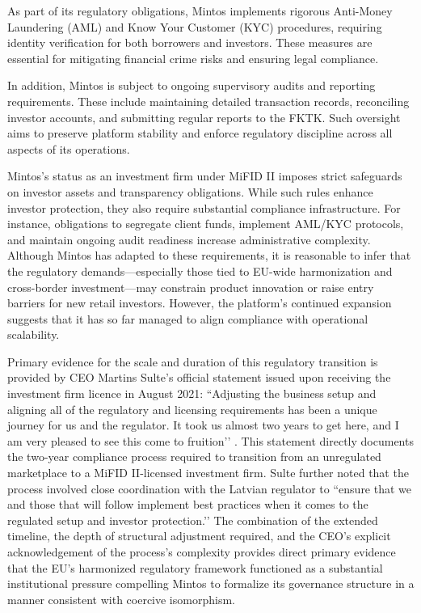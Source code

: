 \documentclass[pdflatex,sn-apa]{sn-jnl}%
\theoremstyle{thmstyleone}%
\theoremstyle{thmstyletwo}%
\theoremstyle{thmstylethree}%
\begin{document}
As part of its regulatory obligations, Mintos implements rigorous Anti-Money Laundering (AML) and Know Your Customer (KYC) procedures, requiring identity verification for both borrowers and investors. These measures are essential for mitigating financial crime risks and ensuring legal compliance.

In addition, Mintos is subject to ongoing supervisory audits and reporting requirements. These include maintaining detailed transaction records, reconciling investor accounts, and submitting regular reports to the FKTK. Such oversight aims to preserve platform stability and enforce regulatory discipline across all aspects of its operations.

Mintos’s status as an investment firm under MiFID II imposes strict safeguards on investor assets and transparency obligations. While such rules enhance investor protection, they also require substantial compliance infrastructure. For instance, obligations to segregate client funds, implement AML/KYC protocols, and maintain ongoing audit readiness increase administrative complexity. Although Mintos has adapted to these requirements, it is reasonable to infer that the regulatory demands—especially those tied to EU-wide harmonization and cross-border investment—may constrain product innovation or raise entry barriers for new retail investors. However, the platform’s continued expansion suggests that it has so far managed to align compliance with operational scalability.

\textcolor{NavyBlue}{Primary evidence for the scale and duration of this regulatory transition is provided by CEO Martins Sulte’s official statement issued upon receiving the investment firm licence in August 2021: ``Adjusting the business setup and aligning all of the regulatory and licensing requirements has been a unique journey for us and the regulator. It took us almost two years to get here, and I am very pleased to see this come to fruition’’ \citep{blog_mintos_2021}. This statement directly documents the two-year compliance process required to transition from an unregulated marketplace to a MiFID II-licensed investment firm. Sulte further noted that the process involved close coordination with the Latvian regulator to ``ensure that we and those that will follow implement best practices when it comes to the regulated setup and investor protection.’’ The combination of the extended timeline, the depth of structural adjustment required, and the CEO’s explicit acknowledgement of the process’s complexity provides direct primary evidence that the EU’s harmonized regulatory framework functioned as a substantial institutional pressure compelling Mintos to formalize its governance structure in a manner consistent with coercive isomorphism.}
\end{document}
